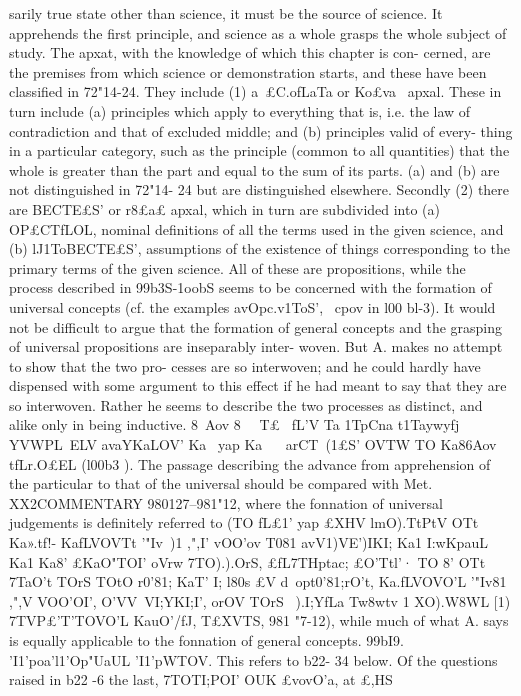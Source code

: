 {{{{{{{{{{{{{{{{{{{{{{{{{{{{{{{{{{{{{{{{{{{{{{{{{{{{{{{{{{{{{{{{{{{{{{{{{{sarily true state other than science, it must be the source of
science. It apprehends the first principle, and science as a whole
grasps the whole subject of study.
The apxat, with the knowledge of which this chapter is con-
cerned, are the premises from which science or demonstration
starts, and these have been classified in 72"14-24. They include
(1) a~£C.ofLaTa or Ko£va~ apxal. These in turn include (a) principles
which apply to everything that is, i.e. the law of contradiction
and that of excluded middle; and (b) principles valid of every-
thing in a particular category, such as the principle (common to
all quantities) that the whole is greater than the part and equal
to the sum of its parts. (a) and (b) are not distinguished in 72"14-
24 but are distinguished elsewhere. Secondly (2) there are BECTE£S'
or r8£a£ apxal, which in turn are subdivided into (a) OP£CTfLOL,
nominal definitions of all the terms used in the given science, and
(b) lJ1ToBECTE£S', assumptions of the existence of things corresponding
to the primary terms of the given science.
All of these are propositions, while the process described in
99b3S-1oobS seems to be concerned with the formation of universal
concepts (cf. the examples avOpc.v1ToS', ~cpov in l00 bl-3). It would
not be difficult to argue that the formation of general concepts
and the grasping of universal propositions are inseparably inter-
woven. But A. makes no attempt to show that the two pro-
cesses are so interwoven; and he could hardly have dispensed
with some argument to this effect if he had meant to say that they
are so interwoven. Rather he seems to describe the two processes
as distinct, and alike only in being inductive. 8~Aov 8~ ~T£ ~fL'V
Ta 1TpCna t1Taywyfj YVWPL~ELV avaYKaLOV' Ka~ yap Ka~ ~ arCT~(1£S'
OVTW TO Ka86Aov tfLr.O£EL (l00b3 ).
The passage describing the advance from apprehension of the
particular to that of the universal should be compared with Met.
XX2COMMENTARY
980127--981"12, where the fonnation of universal judgements is
definitely referred to (TO fL£1' yap £XHV lmO).T}tPtV OTt Ka».tf!- KafLVOVTt
'"Iv~)1 ,",I' vOO'ov T081 avV1)VE')IKI; Ka1 I:wKpauL Ka1 Ka8' £KaO"TOI' oVrw
7TO).).OrS, £fL7THptac; £O'Ttl'· TO 8' OTt 7TaO't TOrS TOtO r0'81; KaT' I; l80s £V
d~opt0'81;rO't, Ka.fLVOVO'L '"Iv81 ,",V VOO'OI', O'VV~VI;YKI;I', orOV TOrS ~).I;YfLa­
Tw8wtv 1} XO).W8WL [1}) 7TVP£'T'TOVO'L KauO'/fJ, T£XVT}S, 981 "7-12), while
much of what A. says is equally applicable to the fonnation of
general concepts.
99bI9. 'I1'poa'l1'Op"UaUL 'I1'pWTOV. This refers to b22- 34 below. Of
the questions raised in b22 -6 the last, 7TOTI;POI' OUK £vovO'a, at £,HS
}}}}}}}}}}}}}}}}}}}}}}}}}}}}}}}}}}}}}}}}}}}}}}}}}}}}}}}}}}}}}}}}}}}}}}
